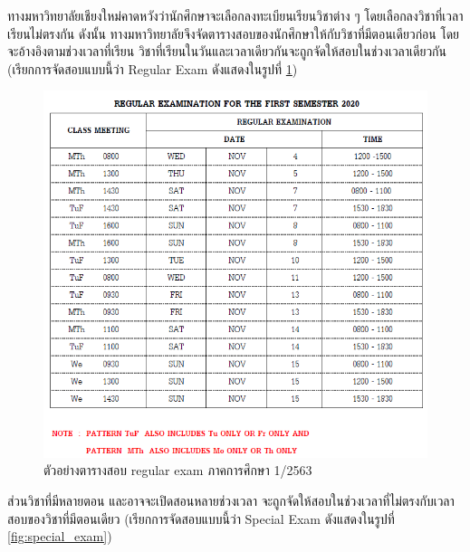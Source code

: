 ทางมหาวิทยาลัยเชียงใหม่คาดหวังว่านักศึกษาจะเลือกลงทะเบียนเรียนวิชาต่าง ๆ โดยเลือกลงวิชาที่เวลาเรียนไม่ตรงกัน 
ดังนั้น ทางมหาวิทยาลัยจึงจัดตารางสอบของนักศึกษาให้กับวิชาที่มีตอนเดียวก่อน โดยจะอ้างอิงตามช่วงเวลาที่เรียน 
วิชาที่เรียนในวันและเวลาเดียวกันจะถูกจัดให้สอบในช่วงเวลาเดียวกัน (เรียกการจัดสอบแบบนี้ว่า Regular Exam ดังแสดงในรูปที่ \ref{fig:regular_exam}) 
%
\begin{figure}
    \centering
    \includegraphics[width=\linewidth]{images/regular_exam.png}
    \caption[ตัวอย่างตารางสอบ regular exam เทอม 1/2563]{ตัวอย่างตารางสอบ regular exam ภาคการศึกษา 1/2563}
    \label{fig:regular_exam}     
\end{figure}
%
ส่วนวิชาที่มีหลายตอน และอาจจะเปิดสอนหลายช่วงเวลา จะถูกจัดให้สอบในช่วงเวลาที่ไม่ตรงกับเวลาสอบของวิชาที่มีตอนเดียว  (เรียกการจัดสอบแบบนี้ว่า Special Exam ดังแสดงในรูปที่ \ref{fig:special_exam}) 
%
